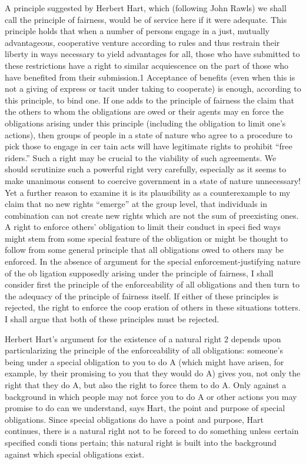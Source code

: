 \documentclass[11pt,openany]{book}
\begin{document}
A principle suggested by Herbert Hart, which (following John Rawls) we shall call the principle of fairness, would be of service here if it were adequate. This principle holds that when a number of persons engage in a just, mutually advantageous, cooperative venture according to rules and thus restrain their liberty in ways necessary to yield advantages for all, those who have submitted to these restrictions have a right to similar acquiescence on the part of those who have benefited from their submission.1 Acceptance of benefits (even when this is not a giving of express or tacit under taking to cooperate) is enough, according to this principle, to bind one. If one adds to the principle of fairness the claim that the others to whom the obligations are owed or their agents may en force the obligations arising under this principle (including the obligation to limit one's actions), then groups of people in a state of nature who agree to a procedure to pick those to engage in cer tain acts will have legitimate rights to prohibit ``free riders.'' Such a right may be crucial to the viability of such agreements. We should scrutinize such a powerful right very carefully, especially as it seems to make unanimous consent to coercive government in a state of nature unnecessary! Yet a further reason to examine it is its plausibility as a counterexample to my claim that no new rights ``emerge'' at the group level, that individuals in combination can not create new rights which are not the sum of preexisting ones. A right to enforce others' obligation to limit their conduct in speci fied ways might stem from some special feature of the obligation or might be thought to follow from some general principle that all obligations owed to others may be enforced. In the absence of argument for the special enforcement-justifying nature of the ob ligation supposedly arising under the principle of fairness, I shall consider first the principle of the enforceability of all obligations and then turn to the adequacy of the principle of fairness itself. If either of these principles is rejected, the right to enforce the coop eration of others in these situations totters. I shall argue that both of these principles must be rejected. 

Herbert Hart's argument for the existence of a natural right 2 depends upon particularizing the principle of the enforceability of all obligations: someone's being under a special obligation to you to do A (which might have arisen, for example, by their promising to you that they would do A) gives you, not only the right that they do A, but also the right to force them to do A. Only against a background in which people may not force you to do A or other actions you may promise to do can we understand, says Hart, the point and purpose of special obligations. Since special obligations do have a point and purpose, Hart continues, there is a natural right not to be forced to do something unless certain specified condi tions pertain; this natural right is built into the background against which special obligations exist. 
\end{document}
